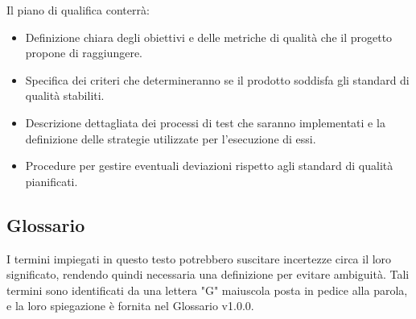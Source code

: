 \documentclass{article}
\begin{document}
{Il piano di qualifica conterrà:

\begin{itemize}
    \item Definizione chiara degli obiettivi e delle metriche di qualità che il progetto propone di raggiungere.
        
    \item Specifica dei criteri che determineranno se il prodotto soddisfa gli standard di qualità stabiliti.
    
    \item Descrizione dettagliata dei processi di test che saranno implementati e la definizione delle strategie utilizzate per l'esecuzione di essi.

    \item Procedure per gestire eventuali deviazioni rispetto agli standard di qualità pianificati.

\end{itemize}

\subsection{Glossario}
I termini impiegati in questo testo potrebbero suscitare incertezze circa il loro significato, rendendo quindi necessaria una definizione per evitare ambiguità. Tali termini sono identificati da una lettera "G" maiuscola posta in pedice alla parola, e la loro spiegazione è fornita nel Glossario v1.0.0.

}
\end{document}
